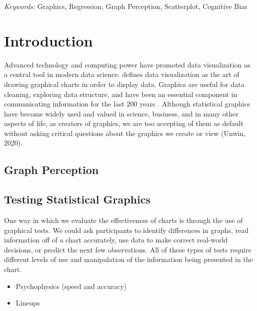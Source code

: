 \documentclass[12pt]{article}
\providecommand{\tightlist}{%
  \setlength{\itemsep}{0pt}\setlength{\parskip}{0pt}}
\begin{document}
\noindent%
{\it Keywords:} Graphics, Regression, Graph
Perception, Scatterplot, Cognitive Bias
\vfill

\newpage
{} %

\hypertarget{introduction}{%
\section{Introduction}\label{introduction}}

Advanced technology and computing power have promoted data visualization
as a central tool in modern data science. \citet{unwin2020data} defines
data visualization as the art of drawing graphical charts in order to
display data. Graphics are useful for data cleaning, exploring data
structure, and have been an essential component in communicating
information for the last 200 years \citep{lewandowsky1989perception}.
Although statistical graphics have become widely used and valued in
science, business, and in many other aspects of life, as creators of
graphics, we are too accepting of them as default without asking
critical questions about the graphics we create or view (Unwin, 2020).

\hypertarget{graph-perception}{%
\subsection{Graph Perception}\label{graph-perception}}

\hypertarget{testing-statistical-graphics}{%
\subsection{Testing Statistical
Graphics}\label{testing-statistical-graphics}}

One way in which we evaluate the effectiveness of charts is through the
use of graphical tests. We could ask participants to identify
differences in graphs, read information off of a chart accurately, use
data to make correct real-world decisions, or predict the next few
observations. All of these types of tests require different levels of
use and manipulation of the information being presented in the chart.

\begin{itemize}
\tightlist
\item
  Psychophysics (speed and accuracy)
\item
  Lineups
\end{itemize}
\end{document}
